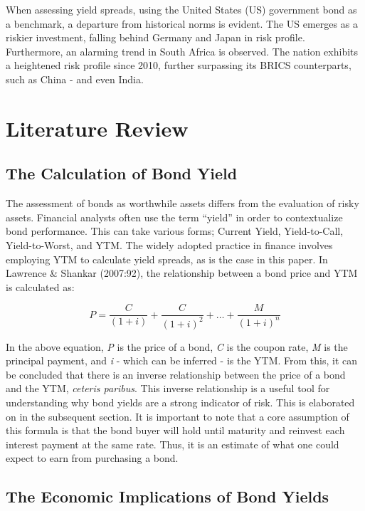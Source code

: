 \documentclass[11pt,preprint, authoryear]{elsarticle}
\numberwithin{equation}{section}
\numberwithin{figure}{section}
\numberwithin{table}{section}
\begin{document}
When assessing yield spreads, using the United States (US) government
bond as a benchmark, a departure from historical norms is evident. The
US emerges as a riskier investment, falling behind Germany and Japan in
risk profile. Furthermore, an alarming trend in South Africa is
observed. The nation exhibits a heightened risk profile since 2010,
further surpassing its BRICS counterparts, such as China - and even
India.

\hypertarget{literature-review}{%
\section{Literature Review}\label{literature-review}}

\hypertarget{the-calculation-of-bond-yield}{%
\subsection{The Calculation of Bond
Yield}\label{the-calculation-of-bond-yield}}

The assessment of bonds as worthwhile assets differs from the evaluation
of risky assets. Financial analysts often use the term ``yield'' in
order to contextualize bond performance. This can take various forms;
Current Yield, Yield-to-Call, Yield-to-Worst, and YTM. The widely
adopted practice in finance involves employing YTM to calculate yield
spreads, as is the case in this paper. In Lawrence \& Shankar (2007:92),
the relationship between a bond price and YTM is calculated as:

\[ P = \frac{C}{(1+i)} + \frac{C}{(1+i)^2} + \ldots + \frac{M}{(1+i)^n} \]

In the above equation, \emph{P} is the price of a bond, \emph{C} is the
coupon rate, \emph{M} is the principal payment, and \emph{i} - which can
be inferred - is the YTM. From this, it can be concluded that there is
an inverse relationship between the price of a bond and the YTM,
\emph{ceteris paribus}. This inverse relationship is a useful tool for
understanding why bond yields are a strong indicator of risk. This is
elaborated on in the subsequent section. It is important to note that a
core assumption of this formula is that the bond buyer will hold until
maturity and reinvest each interest payment at the same rate. Thus, it
is an estimate of what one could expect to earn from purchasing a bond.

\hypertarget{the-economic-implications-of-bond-yields}{%
\subsection{The Economic Implications of Bond
Yields}\label{the-economic-implications-of-bond-yields}}
\end{document}
